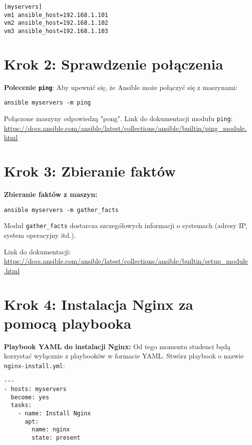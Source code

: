 \documentclass{article}
\begin{document}
\begin{lstlisting}
[myservers]
vm1 ansible_host=192.168.1.101
vm2 ansible_host=192.168.1.102
vm3 ansible_host=192.168.1.103
\end{lstlisting}

\section{Krok 2: Sprawdzenie połączenia}

\textbf{Polecenie \texttt{ping}}:  
Aby upewnić się, że Ansible może połączyć się z maszynami:

\begin{lstlisting}
ansible myservers -m ping
\end{lstlisting}

Połączone maszyny odpowiedzą "pong".  
Link do dokumentacji modułu \texttt{ping}:  
\url{https://docs.ansible.com/ansible/latest/collections/ansible/builtin/ping_module.html}

\section{Krok 3: Zbieranie faktów}

\textbf{Zbieranie faktów z maszyn:}

\begin{lstlisting}
ansible myservers -m gather_facts
\end{lstlisting}

Moduł \texttt{gather\_facts} dostarcza szczegółowych informacji o systemach (adresy IP, system operacyjny itd.).  

Link do dokumentacji:  
\url{https://docs.ansible.com/ansible/latest/collections/ansible/builtin/setup_module.html}

\section{Krok 4: Instalacja Nginx za pomocą playbooka}

\textbf{Playbook YAML do instalacji Nginx:}  
Od tego momentu studenci będą korzystać wyłącznie z playbooków w formacie YAML. Stwórz playbook o nazwie \texttt{nginx-install.yml}:

\begin{lstlisting}
---
- hosts: myservers
  become: yes
  tasks:
    - name: Install Nginx
      apt:
        name: nginx
        state: present
\end{lstlisting}
\end{document}
